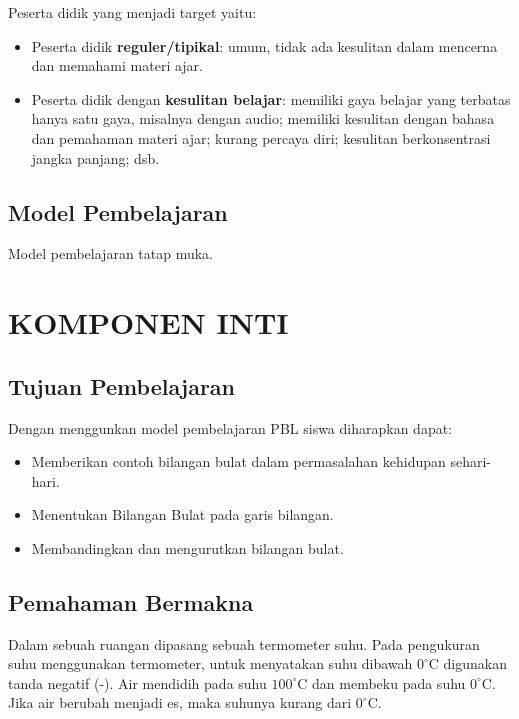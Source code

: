 \documentclass[a5paper,10pt,openany]{book}
\begin{document}
{\color{NavyBlue}Peserta didik yang menjadi target yaitu:
\begin{itemize}[\faCheckSquare,leftmargin=*,itemsep=-4pt,topsep=2pt]
\item Peserta didik \textbf{reguler/tipikal}: umum, tidak ada kesulitan dalam mencerna dan memahami materi
ajar.
\item Peserta didik dengan \textbf{kesulitan belajar}: memiliki gaya belajar yang terbatas hanya satu gaya, misalnya dengan audio; memiliki kesulitan dengan bahasa dan pemahaman materi ajar; kurang percaya diri;
kesulitan berkonsentrasi jangka panjang; dsb.
\end{itemize}}

\section{Model Pembelajaran}

{\color{NavyBlue} Model pembelajaran tatap muka.}

\chapter{KOMPONEN INTI}

\section{Tujuan Pembelajaran}

{\color{NavyBlue}Dengan menggunkan model pembelajaran PBL siswa diharapkan dapat:
\begin{itemize}[\faCheckCircle,leftmargin=*,itemsep=-4pt,topsep=2pt]
	\item 	Memberikan contoh bilangan bulat dalam permasalahan kehidupan sehari-hari.
	\item 	Menentukan Bilangan Bulat pada garis bilangan.
	\item Membandingkan dan mengurutkan bilangan bulat.
\end{itemize}}

\section{Pemahaman Bermakna}

{\color{NavyBlue}Dalam sebuah ruangan dipasang sebuah termometer suhu. Pada pengukuran suhu menggunakan termometer, untuk menyatakan suhu dibawah $0^\circ$C digunakan tanda negatif (-). Air mendidih pada suhu $100^\circ$C dan membeku pada suhu $0^\circ$C. Jika air berubah menjadi es, maka suhunya kurang dari $0^\circ$C.}
\end{document}
